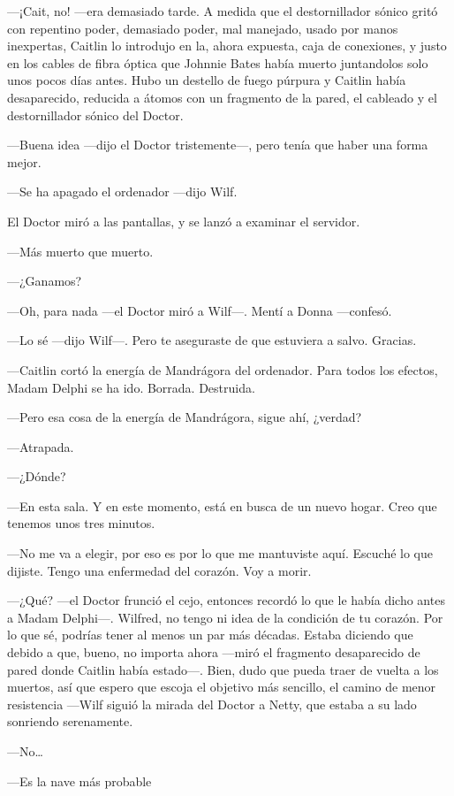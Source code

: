 ---¡Cait, no! ---era demasiado tarde. A medida que el destornillador
sónico gritó con repentino poder, demasiado poder, mal manejado, usado
por manos inexpertas, Caitlin lo introdujo en la, ahora expuesta, caja
de conexiones, y justo en los cables de fibra óptica que Johnnie Bates
había muerto juntandolos solo unos pocos días antes. Hubo un destello de
fuego púrpura y Caitlin había desaparecido, reducida a átomos con un
fragmento de la pared, el cableado y el destornillador sónico del
Doctor.

---Buena idea ---dijo el Doctor tristemente---, pero tenía que haber una
forma mejor.

---Se ha apagado el ordenador ---dijo Wilf.

El Doctor miró a las pantallas, y se lanzó a examinar el servidor.

---Más muerto que muerto.

---¿Ganamos?

---Oh, para nada ---el Doctor miró a Wilf---. Mentí a Donna ---confesó.

---Lo sé ---dijo Wilf---. Pero te aseguraste de que estuviera a salvo.
Gracias.

---Caitlin cortó la energía de Mandrágora del ordenador. Para todos los
efectos, Madam Delphi se ha ido. Borrada. Destruida.

---Pero esa cosa de la energía de Mandrágora, sigue ahí, ¿verdad?

---Atrapada.

---¿Dónde?

---En esta sala. Y en este momento, está en busca de un nuevo hogar.
Creo que tenemos unos tres minutos.

---No me va a elegir, por eso es por lo que me mantuviste aquí. Escuché
lo que dijiste. Tengo una enfermedad del corazón. Voy a morir.

---¿Qué? ---el Doctor frunció el cejo, entonces recordó lo que le había
dicho antes a Madam Delphi---. Wilfred, no tengo ni idea de la condición
de tu corazón. Por lo que sé, podrías tener al menos un par más décadas.
Estaba diciendo que debido a que, bueno, no importa ahora ---miró el
fragmento desaparecido de pared donde Caitlin había estado---. Bien,
dudo que pueda traer de vuelta a los muertos, así que espero que escoja
el objetivo más sencillo, el camino de menor resistencia ---Wilf siguió
la mirada del Doctor a Netty, que estaba a su lado sonriendo
serenamente.

---No\ldots{}

---Es la nave más probable

